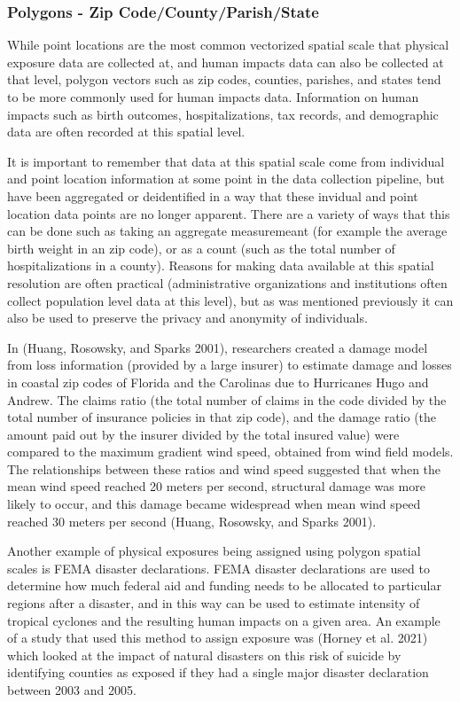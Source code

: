 \documentclass[
]{article}
\begin{document}
\hypertarget{polygons---zip-codecountyparishstate}{%
\subsubsection{Polygons - Zip
Code/County/Parish/State}\label{polygons---zip-codecountyparishstate}}

While point locations are the most common vectorized spatial scale that
physical exposure data are collected at, and human impacts data can also
be collected at that level, polygon vectors such as zip codes, counties,
parishes, and states tend to be more commonly used for human impacts
data. Information on human impacts such as birth outcomes,
hospitalizations, tax records, and demographic data are often recorded
at this spatial level.

It is important to remember that data at this spatial scale come from
individual and point location information at some point in the data
collection pipeline, but have been aggregated or deidentified in a way
that these invidual and point location data points are no longer
apparent. There are a variety of ways that this can be done such as
taking an aggregate measuremeant (for example the average birth weight
in an zip code), or as a count (such as the total number of
hospitalizations in a county). Reasons for making data available at this
spatial resolution are often practical (administrative organizations and
institutions often collect population level data at this level), but as
was mentioned previously it can also be used to preserve the privacy and
anonymity of individuals.

In (Huang, Rosowsky, and Sparks 2001), researchers created a damage
model from loss information (provided by a large insurer) to estimate
damage and losses in coastal zip codes of Florida and the Carolinas due
to Hurricanes Hugo and Andrew. The claims ratio (the total number of
claims in the code divided by the total number of insurance policies in
that zip code), and the damage ratio (the amount paid out by the insurer
divided by the total insured value) were compared to the maximum
gradient wind speed, obtained from wind field models. The relationships
between these ratios and wind speed suggested that when the mean wind
speed reached 20 meters per second, structural damage was more likely to
occur, and this damage became widespread when mean wind speed reached 30
meters per second (Huang, Rosowsky, and Sparks 2001).

Another example of physical exposures being assigned using polygon
spatial scales is FEMA disaster declarations. FEMA disaster declarations
are used to determine how much federal aid and funding needs to be
allocated to particular regions after a disaster, and in this way can be
used to estimate intensity of tropical cyclones and the resulting human
impacts on a given area. An example of a study that used this method to
assign exposure was (Horney et al. 2021) which looked at the impact of
natural disasters on this risk of suicide by identifying counties as
exposed if they had a single major disaster declaration between 2003 and
2005.
\end{document}
